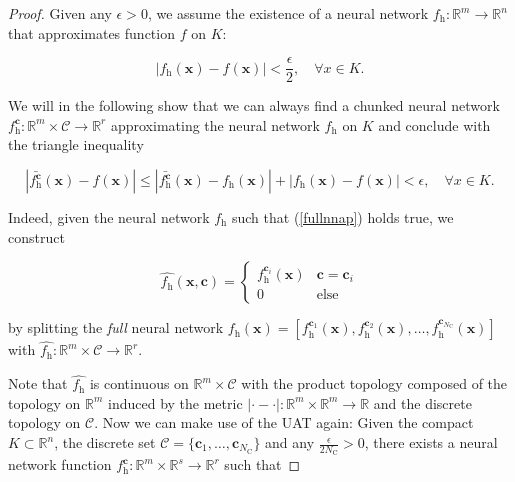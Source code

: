 \documentclass{article}
\begin{document}
  
  \begin{proof}
  Given any $\epsilon > 0$, we assume the existence of a neural network $f_\mathrm{h}: \mathbb{R}^m \to \mathbb{R}^n$ that approximates function $f$ on $K$:
  
  \begin{equation}
  \label{fullnnap}
  |f_\mathrm{h}(\mathbf{x}) - f(\mathbf{x})| < \frac{\epsilon}{2}, \quad \forall x \in K.
  \end{equation}
  
  We will in the following show that we can always find a chunked neural network $f^{\mathbf{c}}_\mathrm{h} : \mathbb{R}^m \times \mathcal{C} \to \mathbb{R}^r$
  approximating the neural network $f_\mathrm{h}$ on $K$ and conclude with the triangle inequality 
  
  \begin{equation}
   \label{triangle}
  |\bar{f^{\mathbf{c}}_\mathrm{h}}(\mathbf{x})  - f(\mathbf{x})| \leq |\bar{f^{\mathbf{c}}_\mathrm{h}}(\mathbf{x})  - f_\mathrm{h}(\mathbf{x})| + | f_\mathrm{h}(\mathbf{x}) -f(\mathbf{x})| < \epsilon, \quad \forall x \in K.
  \end{equation}
  


  Indeed, given the neural network $f_\mathrm{h}$  such that (\ref{fullnnap}) holds true, we construct 
  
  \begin{equation}
   \hat{f_\mathrm{h}}(\mathbf{x}, \mathbf{c}) = \begin{cases}
  f_\mathrm{h}^{\mathbf{c}_i}(\mathbf{x}) & \mathbf{c} = \mathbf{c}_i \\
  0 & \text{else}  
  \end{cases}
  \end{equation}
  
  by splitting the \textit{full} neural network 
  $f_\mathrm{h}(\mathbf{x}) = [f_\mathrm{h}^{\mathbf{c}_1}(\mathbf{x}), f_\mathrm{h}^{\mathbf{c}_2}(\mathbf{x}), \dots,  f_\mathrm{h}^{\mathbf{c}_{N_\text{C}}}(\mathbf{x})]$ with $\hat{f_\mathrm{h}}: \mathbb{R}^m \times \mathcal{C} \to \mathbb{R}^{r}$. 
  
  
  Note that $\hat{f_\mathrm{h}}$ is continuous on $\mathbb{R}^m \times \mathcal{C}$ with the product topology composed of the topology on $\mathbb{R}^m$ induced by the metric $|\cdot  - \cdot|:\mathbb{R}^m \times \mathbb{R}^m \to \mathbb{R}$ and the discrete topology on $\mathcal{C}$.
  Now we can make use of the UAT again: Given the compact $K \subset \mathbb{R}^n$, the discrete set $\mathcal{C} = \{\mathbf{c}_1, \dots, \mathbf{c}_{N_\text{C}}\}$ and any $\frac{\epsilon}{2N_\text{C}} > 0$, there exists a neural network function 
  $f^{\mathbf{c}}_\mathrm{h}: \mathbb{R}^m \times \mathbb{R}^s \to \mathbb{R}^r$
  such that 
  

\end{proof}
\end{document}
